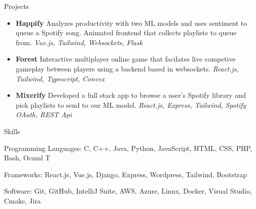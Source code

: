 \documentclass[]{mcdowellcv}
\begin{document}
\begin{cvsection}{Projects}
	\begin{cvsubsection}{}{}{}
		\begin{itemize}
			\setlength\itemsep{3pt}
			\item \textbf{Happify} Analyzes productivity with two ML models and uses sentiment to queue a Spotify song. Animated frontend that collects playlists to queue from. \textit{Vue.js, Tailwind, Websockets, Flask}
			\item \textbf{Forest} Interactive multiplayer online game that facilates live competive gameplay between players using a backend based in websockets. \textit{React.js, Tailwind, Typescript, Convex}
			\item \textbf{Mixerify} Developed a full stack app to browse a user's Spotify library and pick playlists to send to our ML model. \textit{React.js, Express, Tailwind, Spotify OAuth, REST Api}
		\end{itemize}
	\end{cvsubsection}
\end{cvsection}
\begin{cvsection}{Skills}
	\begin{cvsubsection}{}{}{}
		\begin{itemize}
			\item Programming Languages:  C, C++, Java, Python, JavaScript, HTML, CSS, PHP, Bash, Ocaml
			\ifx\WEB T{\item Frameworks: React.js, Vue.js, Django, Express, Wordpress, Tailwind, Bootstrap}\fi
			\item Software:  Git, GitHub, IntelliJ Suite, AWS, Azure, Linux, Docker, Visual Studio, Cmake, Jira
		\end{itemize}
	\end{cvsubsection}
\end{cvsection}
\end{document}
